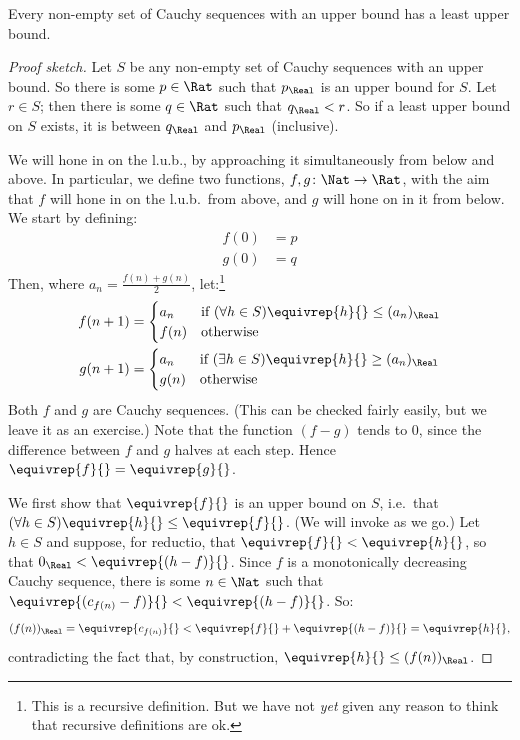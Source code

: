 \documentclass[../../../include/open-logic-section]{subfiles}
\begin{document}
\begin{thm}
Every non-empty set of Cauchy sequences with an upper bound has a
least upper bound.
\end{thm}

\begin{proof}[Proof sketch] Let $S$ be any non-empty set of Cauchy
sequences with an upper bound. So there is some $p \in \Rat$ such that
$p_{\Real}$ is an upper bound for $S$. Let $r \in S$; then there is
some $q \in \Rat$ such that $q_{\Real} < r$. So if a least upper bound
on $S$ exists, it is between $q_\Real$ and $p_\Real$ (inclusive). 

We will hone in on the l.u.b., by approaching it simultaneously from
below and above. In particular, we define two functions, $f, g \colon
\Nat \to \Rat$, with the aim that $f$ will hone in on the l.u.b.\ from
above, and $g$ will hone on in it from below. We start by defining:
\begin{align*}
	f(0) &= p \\
	g(0) &= q
\end{align*}
Then, where $a_n = \frac{f(n) + g(n)}{2}$, let:\footnote{This is a
recursive definition. But we have not \emph{yet} given any reason to
think that recursive definitions are ok.}
\begin{align*}
	f(n+1) &=
	\begin{cases}
		a_n &\text{if }(\forall h \in S)\equivrep{h}{} \leq (a_n)_\Real\\
		f(n)&\text{otherwise}
	\end{cases}\\
	g(n+1) &=
	\begin{cases}
		a_n &\text{if }(\exists h \in S)\equivrep{h}{} \geq (a_n)_\Real\\
	 	g(n) &\text{otherwise}
	\end{cases}
\end{align*}
Both $f$ and $g$ are Cauchy sequences. (This can be checked fairly
easily, but we leave it as an exercise.) Note that the function $(f-g)$
tends to $0$, since the difference between $f$ and $g$ halves at each
step. Hence $\equivrep{f}{} = \equivrep{g}{}$. 

We first show that $\equivrep{f}{}$ is an upper bound on $S$, i.e.\ that $(\forall h \in S)\equivrep{h}{} \leq \equivrep{f}{}$.  
(We will invoke  as we go.) Let $h \in S$ and
suppose, for reductio, that $\equivrep{f}{} < \equivrep{h}{}$, so that
$0_\Real < \equivrep{(h-f)}{}$. Since $f$ is a monotonically
decreasing Cauchy sequence, there is some $n \in \Nat$ such that
$\equivrep{(c_{f(n)} - f)}{} < \equivrep{(h-f)}{}$. So:
\[
	(f(n))_\Real = \equivrep{c_{f(n)}}{} < \equivrep{f}{} + \equivrep{(h-f)}{} = \equivrep{h}{},
\]
contradicting the fact that, by construction, $\equivrep{h}{} \leq (f(n))_\Real$.


\end{proof}
\end{document}
